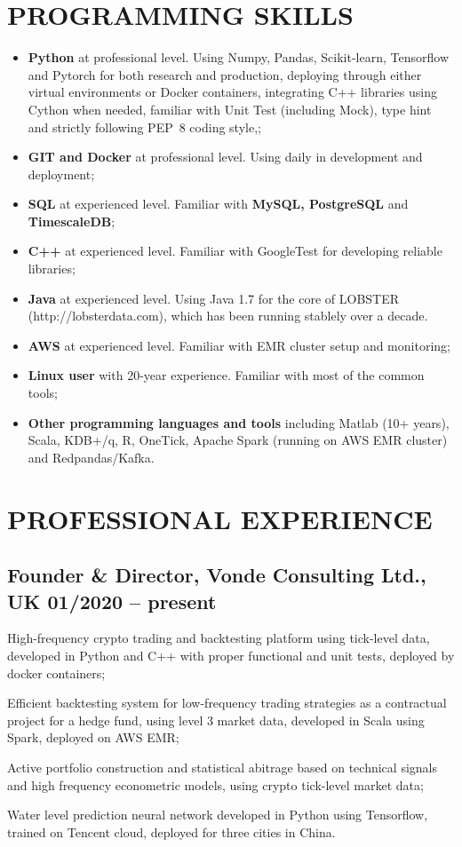 \documentclass[a4paper,10pt]{article}
\begin{document}
\section{PROGRAMMING  SKILLS }
\begin{itemize}
    \item \textbf{Python} at professional level. Using Numpy, Pandas, Scikit-learn, Tensorflow and Pytorch for both research and production,  deploying through either virtual environments or Docker containers, integrating C++ libraries using Cython when needed, familiar with Unit Test (including Mock), type hint and strictly following PEP~8 coding style,;
    \item \textbf{GIT and Docker} at professional level. Using daily in development and deployment; 
    \item \textbf{SQL} at experienced level. Familiar with \textbf{MySQL, PostgreSQL} and  \textbf{TimescaleDB};
    \item \textbf{C++} at experienced level. Familiar with GoogleTest for developing reliable libraries;
    \item \textbf{Java} at experienced level. Using Java 1.7 for the core of LOBSTER (http://lobsterdata.com), which has been running stablely over a decade.  
    \item \textbf{AWS} at experienced level. Familiar with EMR cluster setup and monitoring;
    \item \textbf{Linux user} with 20-year experience. Familiar with most of the common tools;
    \item \textbf{Other programming languages and tools} including Matlab (10+ years), Scala, KDB+/q, R, OneTick, Apache Spark (running on AWS EMR cluster) and Redpandas/Kafka. 
\end{itemize}
\section{PROFESSIONAL EXPERIENCE}
\subsection{Founder \& Director, Vonde Consulting Ltd., UK \hfill 01/2020 -- present}
\begin{idesc}
\item[High-frequency crypto trading and backtesting platform] using tick-level data, developed in Python and C++ with proper functional and unit tests, deployed by docker containers;
\item[Efficient backtesting system for low-frequency trading strategies] as a contractual project for a hedge fund, using level 3 market data, developed in Scala using Spark, deployed on AWS EMR;
\item[Active portfolio construction and statistical abitrage] based on technical signals and high frequency econometric models, using crypto tick-level market data; 
\item[Water level prediction neural network] developed in Python using Tensorflow, trained on Tencent cloud, deployed for three cities in China.
\end{idesc}
\end{document}
